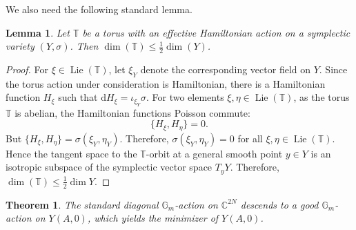 \documentclass[12pt]{amsart}
\newtheorem{thm}[prop]{Theorem}
\newtheorem{lem}[prop]{Lemma}
\theoremstyle{definition}
\newcommand{\bG}{\mathbb{G}}
\newcommand{\rd}{\mathrm{d}}
\numberwithin{equation}{section}
\begin{document}
We also need the following standard lemma. 
\begin{lem}\label{l-dimHamilton}
Let $\mathbb T$ be a torus with an effective Hamiltonian action on a symplectic variety $(Y,\sigma)$. Then $\dim (\mathbb{T})\le \frac{1}{2}\dim (Y)$.
\end{lem}

\begin{proof}
For $\xi\in \operatorname{Lie}(\mathbb T)$, let \(\xi_Y\) denote the corresponding vector field on $Y$. Since the torus action under consideration is Hamiltonian, there is a Hamiltonian function $H_\xi$ such that $\rd H_\xi=\iota_{\xi_Y}\sigma$.
For two elements \(\xi,\eta\in \operatorname{Lie}(\mathbb T)\), as the torus $\mathbb T$ is abelian, the Hamiltonian functions Poisson commute:
\[
        \{H_\xi,H_\eta\}=0 .
\]
But $  \{H_\xi,H_\eta\}=        \sigma(\xi_Y,\eta_Y)$.
Therefore, $      \sigma(\xi_Y,\eta_Y)=0$
for all \(\xi,\eta\in \operatorname{Lie}(\mathbb T)\). Hence the tangent space to the $\mathbb T$-orbit at a general smooth point $y\in Y$ is an isotropic subspace of the symplectic vector space
$ T_yY$. Therefore, $\dim (\mathbb T)\le \frac{1}{2}\dim Y$.
\end{proof}

\begin{thm}\label{t-hypertoric}
The standard diagonal $\bG_m$-action on $\mathbb C^{2N}$ descends to a good \(\mathbb G_m\)-action on \(Y(A,0)\), which yields the minimizer of $Y(A,0)$.
\end{thm}
\end{document}
